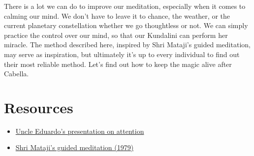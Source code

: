 \documentclass[12pt]{article}
\begin{document}

There is a lot we can do to improve our meditation, especially when it comes to calming our mind.
We don't have to leave it to chance, the weather, or the current planetary constellation whether we go thoughtless or not.
We can simply practice the control over our mind, so that our Kundalini can perform her miracle.
The method described here, inspired by Shri Mataji's guided meditation, may serve as inspiration, but ultimately it's up to every individual to find out their most reliable method.
Let's find out how to keep the magic alive after Cabella.

\section*{Resources}

\begin{itemize}
  \item \href{https://drive.proton.me/urls/CB641G50BR#RgvXq2i1MiLc}{Uncle Eduardo's presentation on attention}
  \item \href{https://www.youtube.com/watch?v=RBUCsIEYK_Y}{Shri Mataji's guided meditation (1979)}
\end{itemize}
\end{document}
